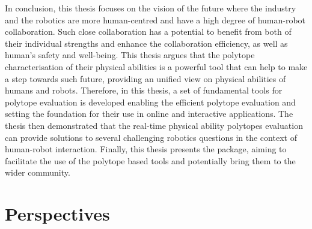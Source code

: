 In conclusion, this thesis focuses on the vision of the future where the industry and the robotics are more human-centred and have a high degree of human-robot collaboration. Such close collaboration has a potential to benefit from both of their individual strengths and enhance the collaboration efficiency, as well as human's safety and well-being. This thesis argues that the polytope characterisation of their physical abilities is a powerful tool that can help to make a step towards such future, providing an unified view on physical abilities of humans and robots. Therefore, in this thesis, a set of fundamental tools for polytope evaluation is developed enabling the efficient polytope evaluation and setting the foundation for their use in online and interactive applications. The thesis then demonstrated that the real-time physical ability polytopes evaluation can provide solutions to several challenging robotics questions in the context of human-robot interaction. Finally, this thesis presents the  package, aiming to facilitate the use of the polytope based tools and potentially bring them to the wider community.



\section{Perspectives}

